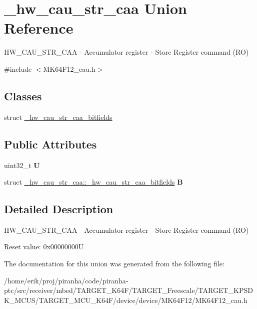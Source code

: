 \hypertarget{union__hw__cau__str__caa}{}\section{\+\_\+hw\+\_\+cau\+\_\+str\+\_\+caa Union Reference}
\label{union__hw__cau__str__caa}


H\+W\+\_\+\+C\+A\+U\+\_\+\+S\+T\+R\+\_\+\+C\+AA -\/ Accumulator register -\/ Store Register command (RO)  




{\ttfamily \#include $<$M\+K64\+F12\+\_\+cau.\+h$>$}

\subsection*{Classes}
\begin{DoxyCompactItemize}
\item 
struct \hyperlink{struct__hw__cau__str__caa_1_1__hw__cau__str__caa__bitfields}{\+\_\+hw\+\_\+cau\+\_\+str\+\_\+caa\+\_\+bitfields}
\end{DoxyCompactItemize}
\subsection*{Public Attributes}
\begin{DoxyCompactItemize}
\item 
uint32\+\_\+t {\bfseries U}\hypertarget{union__hw__cau__str__caa_a750c8e56847ac2c52751a897312c3af9}{}\label{union__hw__cau__str__caa_a750c8e56847ac2c52751a897312c3af9}

\item 
struct \hyperlink{struct__hw__cau__str__caa_1_1__hw__cau__str__caa__bitfields}{\+\_\+hw\+\_\+cau\+\_\+str\+\_\+caa\+::\+\_\+hw\+\_\+cau\+\_\+str\+\_\+caa\+\_\+bitfields} {\bfseries B}\hypertarget{union__hw__cau__str__caa_ae51175afd34ba52c79b5518c160cb59c}{}\label{union__hw__cau__str__caa_ae51175afd34ba52c79b5518c160cb59c}

\end{DoxyCompactItemize}


\subsection{Detailed Description}
H\+W\+\_\+\+C\+A\+U\+\_\+\+S\+T\+R\+\_\+\+C\+AA -\/ Accumulator register -\/ Store Register command (RO) 

Reset value\+: 0x00000000U 

The documentation for this union was generated from the following file\+:\begin{DoxyCompactItemize}
\item 
/home/erik/proj/piranha/code/piranha-\/ptc/src/receiver/mbed/\+T\+A\+R\+G\+E\+T\+\_\+\+K64\+F/\+T\+A\+R\+G\+E\+T\+\_\+\+Freescale/\+T\+A\+R\+G\+E\+T\+\_\+\+K\+P\+S\+D\+K\+\_\+\+M\+C\+U\+S/\+T\+A\+R\+G\+E\+T\+\_\+\+M\+C\+U\+\_\+\+K64\+F/device/device/\+M\+K64\+F12/M\+K64\+F12\+\_\+cau.\+h\end{DoxyCompactItemize}
